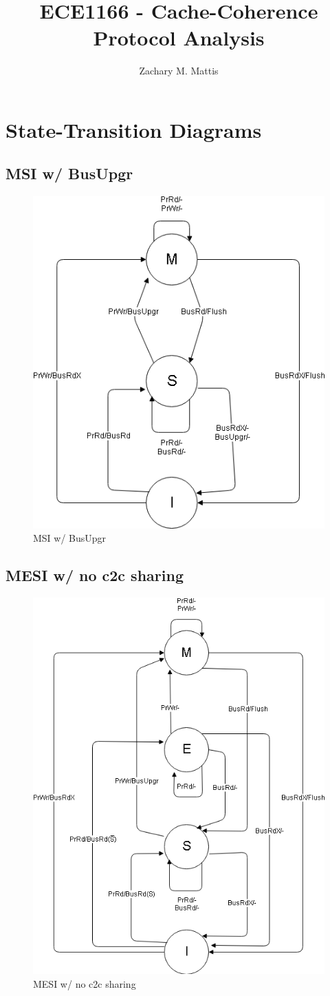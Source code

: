 \documentclass[12pt, letterpaper]{report}
\title{ECE1166 - Cache-Coherence Protocol Analysis}
\author{Zachary M. Mattis}
\begin{document}
	
\maketitle


\section{State-Transition Diagrams}

\subsection{MSI w/ BusUpgr}

\begin{figure}[H]
	\centering
	\includegraphics[width=0.4\columnwidth]{msi.png}
	\caption{MSI w/ BusUpgr}
\end{figure}


\subsection{MESI w/ no c2c sharing}

\begin{figure}[H]
	\centering
	\includegraphics[width=0.4\columnwidth]{mesi_no_c2c.png}
	\caption{MESI w/ no c2c sharing}
\end{figure}
\end{document}
